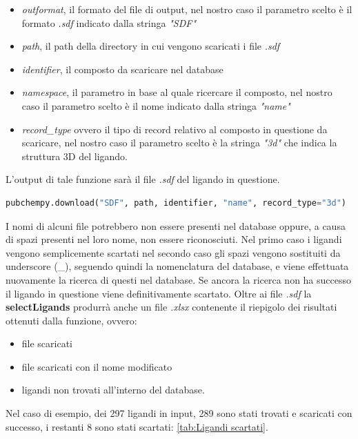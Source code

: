 \begin{itemize}
    \item \textit{outformat}, il formato del file di output, nel nostro caso il parametro scelto è il formato \textit{.sdf} indicato dalla stringa \textit{"SDF"}
    \item \textit{path}, il path della directory in cui vengono scaricati i file \textit{.sdf}
    \item \textit{identifier}, il composto da scaricare nel database
    \item \textit{namespace}, il parametro in base al quale ricercare il composto, nel nostro caso il parametro scelto è il nome indicato dalla stringa \textit{"name"}
    \item \textit{record\_type} ovvero il tipo di record relativo al composto in questione da scaricare, 
    nel nostro caso il parametro scelto è la stringa \textit{"3d"} che indica la struttura 3D del ligando.
\end{itemize}

L'output di tale funzione sarà il file \textit{.sdf} del ligando in questione.

\begin{lstlisting}[language=Python,  label=lst:code6, caption={pubchempy.download}]
pubchempy.download("SDF", path, identifier, "name", record_type="3d")
\end{lstlisting}

I nomi di alcuni file potrebbero non essere presenti nel database oppure, a causa di spazi presenti nel loro nome, non essere riconosciuti. Nel primo caso i ligandi vengono semplicemente scartati nel secondo caso gli spazi vengono sostituiti da underscore (\_), seguendo quindi la nomenclatura del database, e viene effettuata nuovamente la ricerca di questi nel database. Se ancora la ricerca non ha successo il ligando in questione viene definitivamente scartato.\newline
Oltre ai file \textit{.sdf} la \textbf{selectLigands} produrrà anche un file \textit{.xlsx} contenente il riepigolo dei risultati ottenuti dalla funzione, ovvero:

\begin{itemize}
    \item file scaricati
    \item file scaricati con il nome modificato 
    \item ligandi non trovati all'interno del database.
\end{itemize}

Nel caso di esempio, dei 297 ligandi in input, 289 sono stati trovati e scaricati con successo, i restanti 8 sono stati scartati: \ref{tab:Ligandi scartati}.

